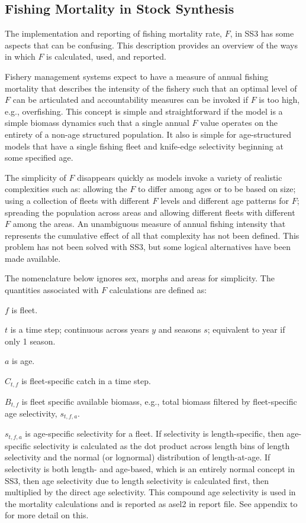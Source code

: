 \subsection{Fishing Mortality in Stock Synthesis}

The implementation and reporting of fishing mortality rate, $F$, in SS3 has some aspects that can be confusing.  This description provides an overview of the ways in which $F$ is calculated, used, and reported.  

Fishery management systems expect to have a measure of annual fishing mortality that describes the intensity of the fishery such that an optimal level of $F$ can be articulated and accountability measures can be invoked if $F$ is too high, e.g., overfishing.  This concept is simple and straightforward if the model is a simple biomass dynamics such that a single annual $F$ value operates on the entirety of a non-age structured population. It also is simple for age-structured models that have a single fishing fleet and knife-edge selectivity beginning at some specified age.

The simplicity of $F$ disappears quickly as models invoke a variety of realistic complexities such as: allowing the $F$ to differ among ages or to be based on size; using a collection of fleets with different $F$ levels and different age patterns for $F$; spreading the population across areas and allowing different fleets with different $F$ among the areas.  An unambiguous measure of annual fishing intensity that represents the cumulative effect of all that complexity has not been defined.  This problem has not been solved with SS3, but some logical alternatives have been made available.

The nomenclature below ignores sex, morphs and areas for simplicity. The quantities associated with $F$ calculations are defined as:

$f$ is fleet.

$t$ is a time step; continuous across years $y$ and seasons $s$; equivalent to year if only 1 season.

$a$ is age.

$C_{t,f}$ is fleet-specific catch in a time step.

$B_{t,f}$ is fleet specific available biomass, e.g., total biomass filtered by fleet-specific age selectivity, $s_{t,f,a}$.

$s_{t,f,a}$ is age-specific selectivity for a fleet. If selectivity is length-specific, then age-specific selectivity is calculated as the dot product across length bins of length selectivity and the normal (or lognormal) distribution of length-at-age.  If selectivity is both length- and age-based, which is an entirely normal concept in SS3, then age selectivity due to length selectivity is calculated first, then multiplied by the direct age selectivity.  This compound age selectivity is used in the mortality calculations and is reported as asel2 in report file.  See appendix to \citet{methotstock2013} for more detail on this.

